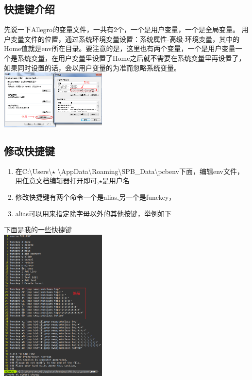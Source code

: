 \documentclass[a4paper,twoside]{article}
\begin{document}
	\subsection{快捷键介绍}
	先说一下Allegro的变量文件，一共有2个，一个是用户变量，一个是全局变量。
	用户变量文件的位置，通过系统环境变量设置：系统属性-高级-环境变量，其中的Home值就是env所在目录。要注意的是，这里也有两个变量，一个是用户变量一个是系统变量，在用户变量里设置了Home之后就不需要在系统变量里再设置了，如果同时设置的话，会以用户变量的为准而忽略系统变量。
	\\ \includegraphics[width=0.4\textwidth]{figures/SystemEnviroment.png}
	\subsection{修改快捷键}
	\begin{enumerate}
		\item 在C:\textbackslash Users\textbackslash $\star$ \textbackslash AppData\textbackslash Roaming\textbackslash SPB\_Data\textbackslash pcbenv下面，编辑env文件，用任意文档编辑器打开即可,$\star$是用户名
		\item 修改快捷键有两个命令一个是alias,另一个是funckey，
		\item alias可以用来指定除字母以外的其他按键，举例如下
	\end{enumerate}
	下面是我的一些快捷键
	\\ \includegraphics[width=0.4\textwidth]{figures/AllegroKey.png}
\end{document}
